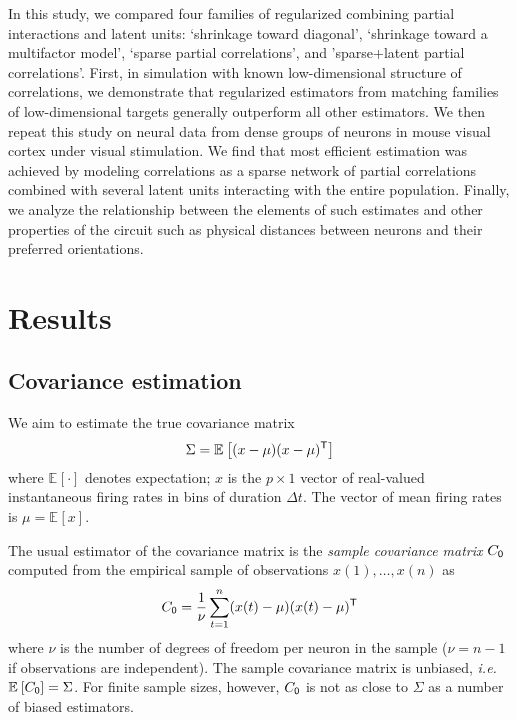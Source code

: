 \documentclass[10pt]{article}
\newcommand{\T}{{\sf T}}
\newcommand{\E}[2][]{\mathbb E_{#1}\left[ #2\right]}    %
\begin{document}
In this study, we compared four families of regularized combining partial interactions and latent units: `shrinkage toward diagonal', `shrinkage toward a multifactor model', `sparse partial correlations', and 'sparse+latent partial correlations'.  First, in simulation with known low-dimensional structure of correlations, we demonstrate that regularized estimators from matching families of low-dimensional targets generally outperform all other estimators. We then repeat this study on neural data from dense groups of neurons in mouse visual cortex under visual stimulation. We find that most efficient estimation was achieved by modeling correlations as a sparse network of partial correlations combined with several latent units interacting with the entire population. Finally, we analyze the relationship between the elements of such estimates and other properties of the circuit such as physical distances between neurons and their preferred orientations. 


\section*{Results}

\subsection*{Covariance estimation}
We aim to estimate the true covariance matrix 
\begin{equation}\label{eq:true-covariance}
\Sigma = \E{(x-\mu)(x-\mu)^\T}
\end{equation}
where $\E{\cdot}$ denotes expectation; $x$ is the $p\times 1$ vector of real-valued instantaneous firing rates in bins of duration $\Delta t$. The vector of mean firing rates is $\mu = \E{x}$.  

The usual estimator of the covariance matrix is the \emph{sample covariance matrix} $C_{\sf 0}$ computed from the empirical sample of observations $x(1),\ldots,x(n)$ as
\begin{equation}
C_{\sf 0} = \frac 1 \nu \sum\limits_{t=1}^n (x(t)-\mu)(x(t)-\mu)^\T 
\end{equation}
where $\nu$ is the number of degrees of freedom per neuron in the sample ($\nu=n-1$ if observations are independent).  
The sample covariance matrix is unbiased, \emph{i.e.} $\E{C_{\sf 0}}=\Sigma$.
For finite sample sizes, however, $C_{\sf 0}$ is not as close to $\Sigma$ as a number of biased estimators.
\end{document}
